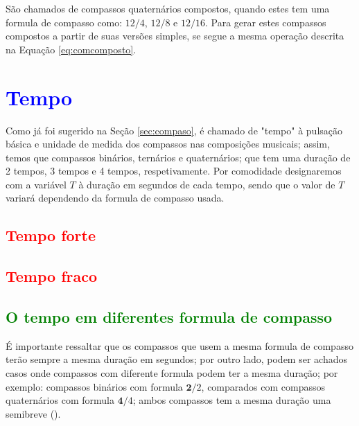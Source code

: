São chamados de compassos quaternários compostos,  
quando estes tem uma formula de compasso como: $12/4$, $12/8$ e $12/16$.
Para gerar estes compassos compostos a partir de suas versões simples,
se segue a mesma operação descrita na Equação \ref{eq:comcomposto}.
 


\section{\textcolor{blue}{Tempo}}

Como já foi sugerido na Seção \ref{sec:compaso}, é chamado de "tempo" 
à pulsação básica e unidade de medida dos compassos nas composições musicais;
assim, temos que compassos binários, ternários e quaternários; que tem uma duração de 2 tempos, 
3 tempos e 4 tempos, respetivamente. Por comodidade designaremos com a variável $T$ à duração em segundos de cada tempo,
sendo que o valor de $T$ variará dependendo da formula de compasso usada.

\subsection{\textcolor{red}{Tempo forte}}


\subsection{\textcolor{red}{Tempo fraco}}

\subsection{\textcolor{green}{O tempo em diferentes formula de compasso}}
É importante ressaltar que os compassos que usem a mesma formula de compasso terão sempre a mesma duração em segundos;
por outro lado, podem ser achados casos onde compassos com diferente formula podem ter a mesma duração;
por exemplo: compassos binários com formula $\mathbf{2}/2$, comparados com compassos quaternários com 
formula $\mathbf{4}/4$; ambos compassos tem a mesma duração uma semibreve (\fullnote).

